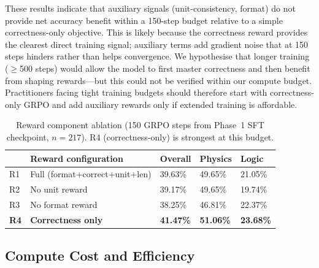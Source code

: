 \documentclass[cmc,journal,article,submit,moreauthors,pdftex]{Definitions/tsp}
\begin{document}
These results indicate that auxiliary signals (unit-consistency, format)
do not provide net accuracy benefit within a 150-step budget relative to
a simple correctness-only objective.
This is likely because the correctness reward provides the clearest
direct training signal; auxiliary terms add gradient noise that at 150
steps hinders rather than helps convergence.
We hypothesise that longer training ($\ge$500 steps) would allow the
model to first master correctness and then benefit from shaping
rewards---but this could not be verified within our compute budget.
Practitioners facing tight training budgets should therefore start with
correctness-only GRPO and add auxiliary rewards only if extended training
is affordable.

\begin{table}[H]
  \tablesize{\footnotesize}
  \caption{Reward component ablation (150 GRPO steps from Phase~1 SFT
           checkpoint, $n=217$). R4 (correctness-only) is strongest at
           this budget.}
  \label{tab:reward_ablation}
  \begin{tabularx}{\textwidth}{lCCCC}
    \toprule
    & \textbf{Reward configuration} & \textbf{Overall} & \textbf{Physics} & \textbf{Logic} \\
    \midrule
    R1 & Full (format+correct+unit+len) & 39.63\% & 49.65\% & 21.05\% \\
    R2 & No unit reward               & 39.17\% & 49.65\% & 19.74\% \\
    R3 & No format reward             & 38.25\% & 46.81\% & 22.37\% \\
    \textbf{R4} & \textbf{Correctness only} & \textbf{41.47\%} & \textbf{51.06\%} & \textbf{23.68\%} \\
    \bottomrule
  \end{tabularx}
\end{table}

\subsection{Compute Cost and Efficiency}\label{sec:compute}
\end{document}

